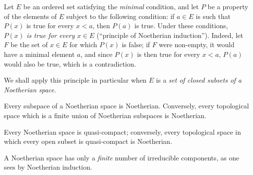 \begin{env}[2.2.2]
\label{0.2.2.2}
Let $E$ be an ordered set satisfying the \emph{minimal} condition, and let
$P$ be a property of the elements of $E$ subject to the following condition: if
$a\in E$ is such that $P(x)$ is true for every $x<a$, then $P(a)$ is
true. Under these conditions, \emph{$P(x)$ is true for every $x\in E$}
(``principle of Noetherian induction''). Indeed, let $F$ be the set of
$x\in E$ for which $P(x)$ is false; if $F$ were non-empty, it would have a
minimal element $a$, and since $P(x)$ is then true for every $x<a$, $P(a)$
would also be true, which is a contradiction.

We shall apply this principle in particular when $E$ is a \emph{set
of closed subsets of a Noetherian space}.
\end{env}

\begin{env}[2.2.3]
\label{0.2.2.3}
Every subspace of a Noetherian space is Noetherian. Conversely, every
topological space which is a finite union of Noetherian subspaces is Noetherian.
\end{env}

\begin{env}[2.2.4]
\label{0.2.2.4}
Every Noetherian space is quasi-compact; conversely, every topological space
in which every open subset is quasi-compact is Noetherian.
\end{env}

\begin{env}[2.2.5]
\label{0.2.2.5}
A Noetherian space has only a \emph{finite} number of irreducible
components, as one sees by Noetherian induction.
\end{env}

